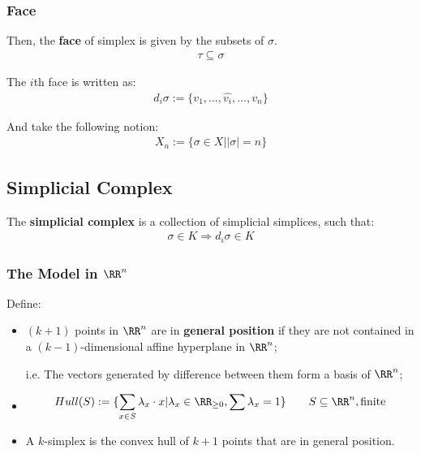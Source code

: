 \documentclass[Total.tex]{subfiles}
\begin{document}
				\subsubsection{Face}
				
				\begin{Def}
					Then, the \textbf{face} of simplex is given by the subsets of $\sigma$. 
					\begin{gather*}
						\tau\subseteq \sigma
					\end{gather*}
					
					The $i$th face is written as:
					\begin{gather*}
						d_i\sigma :=\{v_1,\dots,\hat{v_i},\dots,v_n\}
					\end{gather*}
				\end{Def}
				
				And take the following notion:
				\begin{gather*}
					X_n:=\{\sigma\in X||\sigma|=n\}
				\end{gather*}
			\subsection{Simplicial Complex}
				\begin{Def}
					The \textbf{simplicial complex} is a collection of simplicial simplices, such that:
					\begin{gather*}
						\sigma\in K\Rightarrow d_i\sigma\in K
					\end{gather*}
				\end{Def}
				\subsubsection{The Model in $\RR^n$}
				\begin{Def}
					Define:
					\begin{itemize}
						\item $(k+1)$ points in $\RR^n$ are in \textbf{general position} if they are not contained in a $(k-1)$-dimensional affine hyperplane in $\RR^n$;
						
						i.e. The vectors generated by difference between them form a basis of $\RR^n$;
						\item 
						\begin{gather*}
							Hull(S):=\{\sum_{x\in S} \lambda_x\cdot x|\lambda_x\in \RR_{\geq 0},\sum \lambda_x=1\}\qquad S\subseteq \RR^n,\mbox{finite}
						\end{gather*}
						\item A $k$-simplex is the convex hull of $k+1$ points that are in general position.
					\end{itemize}
				\end{Def}
\end{document}

